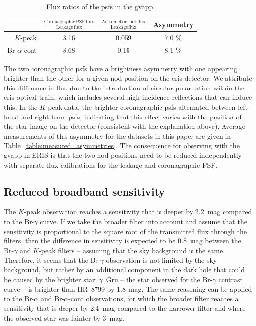 \documentclass{aa}
\begin{document}
\begin{table}
\centering
\caption{Flux ratios of the \acp{psf} in the \ac{gvapp}.}
\begin{tabular}{@{}rccc@{}}
\toprule
                 & $\frac{\mathrm{Coronagraphic\,PSF\,flux}}{\mathrm{Leakage\,flux}}$ & $\frac{\mathrm{Astrometric\,spot\,flux}}{\mathrm{Leakage\,flux}}$ & Asymmetry \\ \midrule
$K$-peak           & 3.16            &  0.059                 &   7.0 \%           \\
Br-$\alpha$-cont &     8.68     &    0.16           &  8.1 \%         \\ \bottomrule
\end{tabular}

%
\end{table}

The two coronagraphic \acp{psf} have a brightness asymmetry with one appearing brighter than the other for a given nod position on the \ac{eris} detector.
%
We attribute this difference in flux due to the introduction of circular polarisation within the \ac{eris} optical train, which includes several high incidence reflections that can induce this.
%
In the $K$-peak data, the brighter coronagraphic \acp{psf} alternated between left-hand and right-hand \acp{psf}, indicating that this effect varies with the position of the star image on the detector (consistent with the explanation above).
%
Average measurements of this asymmetry for the datasets in this paper are given in Table~\ref{table:measured_asymmetries}.
%
The consequence for observing with the \ac{gvapp} in ERIS is that the two nod positions need to be reduced independently with separate flux calibrations for the leakage and coronagraphic PSF.

\subsection{Reduced broadband sensitivity}\label{sect:reduced_sensitivity}

The $K$-peak observation reaches a sensitivity that is deeper by 2.2~mag compared to the Br-$\gamma$ curve.
%
If we take the broader filter into account and assume that the sensitivity is proportional to the square root of the transmitted flux through the filters, then the difference in sensitivity is expected to be 0.8~mag between the Br-$\gamma$ and $K$-peak filters -- assuming that the sky background is the same.
%
Therefore, it seems that the Br-$\gamma$ observation is not limited by the sky background, but rather by an additional component in the dark hole that could be caused by the brighter star; $\gamma$~Gru -- the star observed for the Br-$\gamma$ contrast curve -- is brighter than HR~8799 by 1.8~mag.
%
The same reasoning can be applied to the Br-$\alpha$ and Br-$\alpha$-cont observations, for which the broader filter reaches a sensitivity that is deeper by 2.4~mag compared to the narrower filter and where the observed star was fainter by 3~mag.
\end{document}
